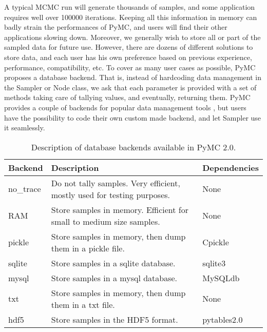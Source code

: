 

A typical MCMC run will generate thousands of samples, and some application requires well over 100000 iterations. Keeping all this information in memory can badly strain the performances of PyMC, and users will find their other applications slowing down. Moreover, we generally wish to store all or part of the sampled data for future use. However, there are dozens of different solutions to store data, and each user has his own preference based on previous experience, performance, compatibility, etc. To cover as many user cases as possible, PyMC proposes a database backend. That is, instead of hardcoding data management in the Sampler or Node class, we ask that each parameter is provided with a set of methods taking care of tallying values, and eventually, returning them. PyMC provides a couple of backends for popular data management tools , but users have the possibility to code their own custom made backend, and let Sampler use it seamlessly.


\begin{longtable}[c]{|p{0.12\locallinewidth}|p{0.60\locallinewidth}|p{0.20\locallinewidth}|}
\caption{Description of database backends available in PyMC 2.0.}\\
\hline
\textbf{
Backend
} & \textbf{
Description
} & \textbf{
Dependencies
} \\
\hline
\endhead

no{\_}trace
 & 
Do not tally samples. Very efficient, mostly used
for testing purposes.
 & 
None
 \\
\hline

RAM
 & 
Store samples in memory. Efficient for small to
medium size samples.
 & 
None
 \\
\hline

pickle
 & 
Store samples in memory, then dump them in a
pickle file.
 & 
Cpickle
 \\
\hline

sqlite
 & 
Store samples in a sqlite database.
 & 
sqlite3
 \\
\hline

mysql
 & 
Store samples in a mysql database.
 & 
MySQLdb
 \\
\hline

txt
 & 
Store samples in memory, then dump them in a txt
file.
 & 
None
 \\
\hline

hdf5
 & 
Store samples in the HDF5 format.
 & 
pytables2.0
 \\
\hline
\end{longtable}

